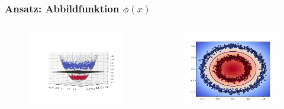 	\begin{frame}
		\frametitle{Ansatz: Abbildfunktion $\phi(x)$}
			\begin{columns}
				\begin{column}{.6\textwidth}
					\begin{figure}
							\includegraphics[width=1\textwidth]{img/nonlinearsvm3dwb.png}
					\end{figure}
				\end{column}
				\begin{column}{.4\textwidth}
					\begin{figure}
							\includegraphics[width=1\textwidth]{img/nonlinearsvmwb.png}
					\end{figure}
				\end{column}
			\end{columns}
	\end{frame}
	
